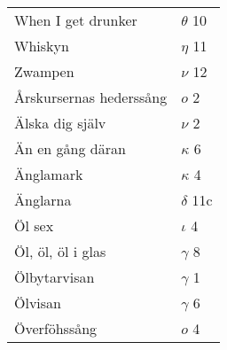 \documentclass[a6paper,10pt]{article}
\begin{document}
\begin{table}[!h]
\begin{tabular}{l l}
When I get drunker	&$\theta$ 10\\
Whiskyn	&$\eta$ 11\\
Zwampen&	$\nu$ 12\\
Årskursernas hederssång&$o$ 2\\
Älska dig själv&$\nu$ 2\\
Än en gång däran&$\kappa$ 6\\
Änglamark&$\kappa$ 4\\
Änglarna&$\delta$ 11c\\
Öl sex&	$\iota$ 4\\
Öl, öl, öl i glas	&$\gamma$ 8\\
Ölbytarvisan	&$\gamma$ 1\\
Ölvisan&$\gamma$ 6\\
Överföhssång&	$o$ 4
\end{tabular}
\end{table}
\end{document}
